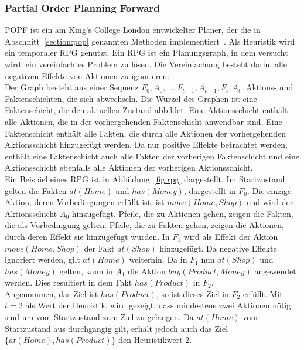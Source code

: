 \subsubsection{Partial Order Planning Forward}
\ac{POPF} ist ein am King’s College London entwickelter Planer, der die in Abschnitt~\ref{section:pop} genannten Methoden implementiert~\citep{popf}.
Als Heuristik wird ein temporaler \ac{RPG} genutzt.
Ein \acf{RPG} ist ein Planungsgraph, in dem versucht wird, ein vereinfachtes Problem zu lösen.
Die Vereinfachung besteht darin, alle negativen Effekte von Aktionen zu ignorieren.\\
Der Graph besteht aus einer Sequenz $F_0, A_0, ..., F_{t-1}, A_{t-1}, F_t, A_t$: Aktions- und Faktenschichten, die sich abwechseln.
Die Wurzel des Graphen ist eine Faktenschicht, die den aktuellen Zustand abbildet.
Eine Aktionsschicht enthält alle Aktionen, die in der vorhergehenden Faktenschicht anwendbar sind.
Eine Faktenschicht enthält alle Fakten, die durch alle Aktionen der vorhergehenden Aktionsschicht hinzugefügt werden.
Da nur positive Effekte betrachtet werden, enthält eine Faktenschicht auch alle Fakten der vorherigen Faktenschicht und eine Aktionsschicht ebenfalls alle Aktionen der vorherigen Aktionsschicht.\\
Ein Beispiel eines \ac{RPG} ist in Abbildung~\ref{fig:rpg} dargestellt.
Im Startzustand gelten die Fakten $at(Home)$ und $has(Money)$, dargestellt in $F_0$.
Die einzige Aktion, deren Vorbedingungen erfüllt ist, ist $move(Home, Shop)$ und wird der Aktionsschicht $A_0$ hinzugefügt.
Pfeile, die zu Aktionen gehen, zeigen die Fakten, die als Vorbedingung gelten.
Pfeile, die zu Fakten gehen, zeigen die Aktionen, durch deren Effekt sie hinzugefügt wurden.
In $F_1$ wird als Effekt der Aktion $move(Home, Shop)$ der Fakt $at(Shop)$ hinzugefügt.
Da negative Effekte ignoriert werden, gilt $at(Home)$ weiterhin.
Da in $F_1$ nun $at(Shop)$ und $has(Money)$ gelten, kann in $A_1$ die Aktion $buy(Product, Money)$ angewendet werden.
Dies resultiert in dem Fakt $has(Product)$ in $F_2$.\\
Angenommen, das Ziel ist $has(Product)$, so ist dieses Ziel in $F_2$ erfüllt.
Mit $t = 2$ als Wert der Heuristik, wird gezeigt, dass mindestens zwei Aktionen nötig sind um vom Startzustand zum Ziel zu gelangen.
Da $at(Home)$ vom Startzustand aus durchgängig gilt, erhält jedoch auch das Ziel $\{at(Home),has(Product)\}$ den Heuristikwert 2.\\

